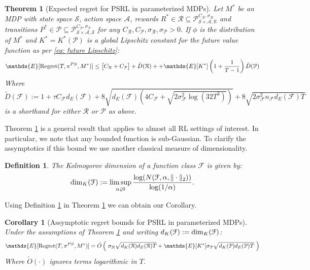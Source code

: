 \documentclass{article}
\newtheorem{theorem}{Theorem}
\newtheorem{corollary}{Corollary}
\newtheorem{mydef}{Definition}
\newcommand{\Exp}{\mathds{E}}
\newcommand{\Real}{\mathds{R}}
\newcommand{\Pc}{\mathcal{P}}
\newcommand{\Fc}{\mathcal{F}}
\newcommand{\Rc}{\mathcal{R}}
\newcommand{\Sc}{\mathcal{S}}
\newcommand{\Ac}{\mathcal{A}}
\begin{document}
\begin{theorem}[Expected regret for PSRL in parameterized MDPs]
\label{thm: main regret} \hspace{0.00000000000001mm} \newline
Let $M^*$ be an MDP with state space $\Sc$, action space $\Ac$, rewards $R^* \in \Rc \subseteq \Pc^{C_\Rc,\sigma_\Rc}_{\Sc \times \Ac,\Real}$ and transitions $P^* \in \Pc \subseteq \Pc^{C_\Pc,\sigma_\Pc}_{\Sc \times \Ac,\Sc}$ for any $C_\Rc, C_\Pc, \sigma_\Rc, \sigma_\Pc >0 $.
If $\phi$ is the distribution of $M^*$ and $K^* = K^*(\Pc)$ is a global Lipschitz constant for the future value function as per \eqref{eq: future Lipschitz}:
\begin{eqnarray}
\label{eq: reg proof}
    \Exp[{\rm Regret}(T,\pi^{PS},M^*)] \le \big[ C_\Rc + C_\Pc \big] + \tilde{D}(\Rc)
    + + \Exp[K^*]\left(1+\frac{1}{T-1}\right) \tilde{D}(\Pc)
\end{eqnarray}
Where $\tilde{D}(\Fc) := 1 + \tau C_\Fc d_E(\Fc) + 8\sqrt{d_E(\Fc)(4C_\Fc + \sqrt{2\sigma_\Fc^2 \log(32T^3)})} + 8\sqrt{2 \sigma_\Fc^2 n_\Fc d_E(\Fc) T}$
is a shorthand for either $\Rc$ or $\Pc$ as above.
\end{theorem}
Theorem \ref{thm: main regret} is a general result that applies to almost all RL settings of interest.
In particular, we note that any bounded function is sub-Gaussian.
To clarify the assymptotics if this bound we use another classical measure of dimensionality.
\begin{mydef}
\label{def: kol}
The Kolmogorov dimension of a function class $\Fc$ is given by:
$$ {\rm dim}_K(\Fc) := \limsup_{\alpha \downarrow 0} \frac{\log(N(\Fc,\alpha,\|\cdot\|_2))}{\log(1/\alpha)} .$$
\end{mydef}
Using Definition \ref{def: kol} in Theorem \ref{thm: main regret} we can obtain our Corollary.
\begin{corollary}[Assymptotic regret bounds for PSRL in parameterized MDPs]
\label{cor: ass regret} \hspace{0.00000000000001mm} \newline
Under the assumptions of Theorem \ref{thm: main regret} and writing $d_K(\Fc) := {\rm dim}_K(\Fc)$:
\begin{equation}
	\Exp[{\rm Regret}(T,\pi^{PS},M^*)] = \tilde{O} \left( \ \sigma_\Rc \sqrt{d_K(\Rc) d_E(\Rc) T}
		+ \Exp[K^*] \sigma_\Pc \sqrt{d_K(\Pc) d_E(\Pc) T} \ \right)
\end{equation}
Where $\tilde{O}(\cdot)$ ignores terms logarithmic in $T$.
\end{corollary}
\end{document}
